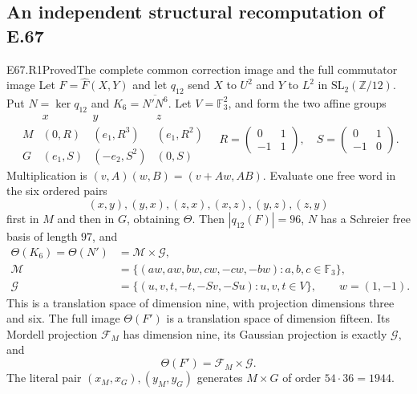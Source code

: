\subsection{An independent structural recomputation of E.67}

\begin{statement}{E67.R1}{Proved}{The complete common correction image and the full commutator image}
Let $F=\widehat F(X,Y)$ and let $q_{12}$ send $X$ to
$U^2$ and $Y$ to $L^2$ in $\mathrm{SL}_2(\mathbb Z/12)$.
Put $N=\ker q_{12}$ and $K_6=\overline{N'N^6}$.
Let $V=\mathbb F_3^2$, and form the two affine groups
\[
 \begin{array}{c|ccc}
 &x&y&z\\ \hline
 M&(0,R)&(e_1,R^3)&(e_1,R^2)\\
 G&(e_1,S)&(-e_2,S^2)&(0,S)
 \end{array}
 \quad
 R=\begin{pmatrix}0&1\\-1&1\end{pmatrix},\quad
 S=\begin{pmatrix}0&1\\-1&0\end{pmatrix}.
\]
Multiplication is $(v,A)(w,B)=(v+Aw,AB)$. Evaluate one free
word in the six ordered pairs
\[
 (x,y),(y,x),(z,x),(x,z),(y,z),(z,y)
\]
first in $M$ and then in $G$, obtaining $\Theta$.
Then $|q_{12}(F)|=96$, $N$ has a Schreier free basis of length
$97$, and
\[
 \begin{split}
 \Theta(K_6)=\Theta(N')&=\mathcal M\times\mathcal G,\\
 \mathcal M&=\{(aw,aw,bw,cw,-cw,-bw):a,b,c\in\mathbb F_3\},\\
 \mathcal G&=\{(u,v,t,-t,-Sv,-Su):u,v,t\in V\},
 \qquad w=(1,-1).
 \end{split}                                                     \tag{ER1}
\]
This is a translation space of dimension nine, with projection
dimensions three and six. The full image $\Theta(F')$ is a
translation space of dimension fifteen. Its Mordell projection
$\mathcal F_M$ has dimension nine, its Gaussian projection is
exactly $\mathcal G$, and
\[
                         \Theta(F')=\mathcal F_M\times\mathcal G.
\]
The literal pair $(x_M,x_G),(y_M,y_G)$ generates $M\times G$ of
order $54\cdot36=1944$.
\end{statement}

